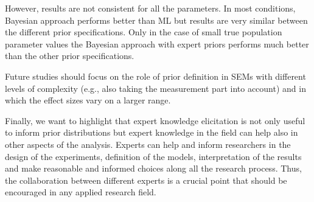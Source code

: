 \documentclass[graybox]{svmult}
\begin{document}
However, results are not consistent for all the parameters. In most conditions, Bayesian approach performs better than ML but results are very similar between the different prior specifications. Only in the case of small true population parameter values the Bayesian approach with expert priors performs much better than the other prior specifications.


Future studies should focus on the role of prior definition in SEMs with different levels of complexity (e.g., also taking the measurement part into account) and in which the effect sizes vary on a larger range.


Finally, we want to highlight that expert knowledge elicitation is not only useful to inform prior distributions but expert knowledge in the field can help also in other aspects of the analysis. Experts can help and inform researchers in the design of the experiments, definition of the models, interpretation of the results and make reasonable and informed choices along all the research process. Thus, the collaboration between different experts is a crucial point that should be encouraged in any applied research field.





%
\end{document}
